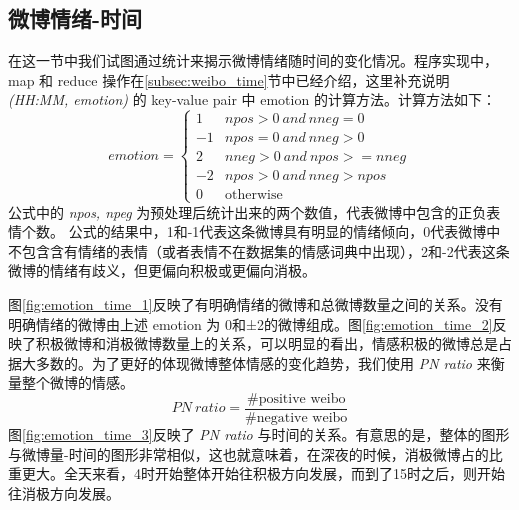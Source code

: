 \documentclass[12pt, oneside]{article}
\begin{document}
\begin{spacing}{1.5}
\begin{CJK}{UTF8}{gbsn}
\subsection{微博情绪-时间}
\label{subsec:emotion_time}
在这一节中我们试图通过统计来揭示微博情绪随时间的变化情况。程序实现中， map 和 reduce 操作在\ref{subsec:weibo_time}节中已经介绍，这里补充说明 {\it(HH:MM, emotion)} 的 key-value pair 中 emotion 的计算方法。计算方法如下：
$$
emotion =
\begin{cases}
1 & npos > 0~and~nneg = 0 \\
-1 & npos = 0~and~nneg > 0 \\
2 & nneg > 0~and~npos >= nneg \\
-2 & npos > 0~and~nneg > npos \\
0 & \text{otherwise}
\end{cases}
$$
公式中的 {\it npos, npeg} 为预处理后统计出来的两个数值，代表微博中包含的正负表情个数。 公式的结果中，1和-1代表这条微博具有明显的情绪倾向，0代表微博中不包含含有情绪的表情（或者表情不在数据集的情感词典中出现），2和-2代表这条微博的情绪有歧义，但更偏向积极或更偏向消极。

图\ref{fig:emotion_time_1}反映了有明确情绪的微博和总微博数量之间的关系。没有明确情绪的微博由上述 emotion 为 0和±2的微博组成。图\ref{fig:emotion_time_2}反映了积极微博和消极微博数量上的关系，可以明显的看出，情感积极的微博总是占据大多数的。为了更好的体现微博整体情感的变化趋势，我们使用 {\it PN ratio} 来衡量整个微博的情感。
$$PN~ratio = \frac{\text{\#positive weibo}}{\text{\#negative weibo}}$$
图\ref{fig:emotion_time_3}反映了 {\it PN ratio} 与时间的关系。有意思的是，整体的图形与微博量-时间的图形非常相似，这也就意味着，在深夜的时候，消极微博占的比重更大。全天来看，4时开始整体开始往积极方向发展，而到了15时之后，则开始往消极方向发展。


\end{CJK}
\end{spacing}
\end{document}
